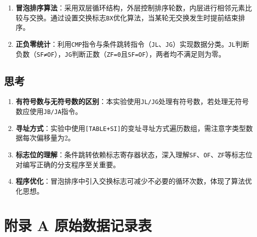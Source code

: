\documentclass[UTF8]{article}
\begin{document}
\begin{enumerate}
    \item \textbf{冒泡排序算法}：采用双层循环结构，外层控制排序轮数，内层进行相邻元素比较与交换。通过设置交换标志\texttt{BX}优化算法，当某轮无交换发生时提前结束排序。
    
    \item \textbf{正负零统计}：利用\texttt{CMP}指令与条件跳转指令（\texttt{JL}、\texttt{JG}）实现数据分类。\texttt{JL}判断负数（\texttt{SF≠OF}），\texttt{JG}判断正数（\texttt{ZF=0}且\texttt{SF=OF}），两者均不满足则为零。
\end{enumerate}

\subsection{思考}

\begin{enumerate}
    \item \textbf{有符号数与无符号数的区别}：本实验使用\texttt{JL/JG}处理有符号数，若处理无符号数应使用\texttt{JB/JA}指令。
    
    \item \textbf{寻址方式}：实验中使用\texttt{[TABLE+SI]}的变址寻址方式遍历数组，需注意字类型数据每次偏移量为2。
    
    \item \textbf{标志位的理解}：条件跳转依赖标志寄存器状态，深入理解\texttt{SF}、\texttt{OF}、\texttt{ZF}等标志位对编写正确的分支程序至关重要。
    
    \item \textbf{程序优化}：冒泡排序中引入交换标志可减少不必要的循环次数，体现了算法优化思想。
\end{enumerate}



















\newpage
\section*{附录 A\hspace*{20pt} 原始数据记录表}
\thispagestyle{fancy} 
\begin{figure}[H]\centering
\end{figure}
\end{document}
